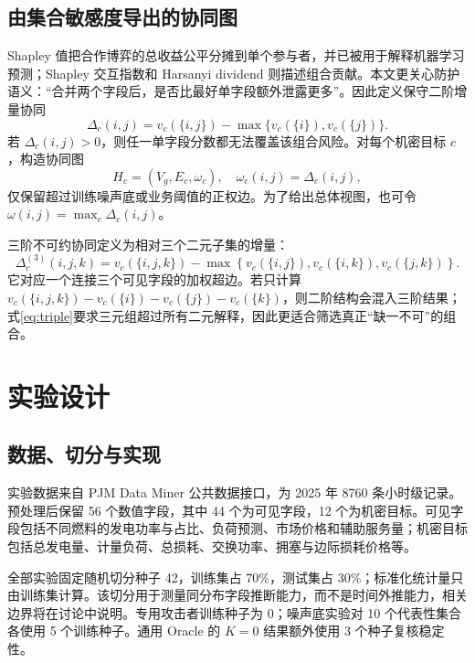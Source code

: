 \documentclass[UTF8,a4paper,zihao=5,fontset=fandol]{ctexart}
\begin{document}
\subsection{由集合敏感度导出的协同图}

Shapley 值把合作博弈的总收益公平分摊到单个参与者\citep{shapley1953value}，并已被用于解释机器学习预测\citep{lundberg2017shap}；Shapley 交互指数和 Harsanyi dividend 则描述组合贡献\citep{harsanyi1963bargaining,grabisch1999interaction}。本文更关心防护语义：“合并两个字段后，是否比最好单字段额外泄露更多”。因此定义保守二阶增量协同
\begin{equation}
  \Delta_c(i,j)=v_c(\{i,j\})
  -\max\{v_c(\{i\}),v_c(\{j\})\}.
  \label{eq:pair}
\end{equation}
若 $\Delta_c(i,j)>0$，则任一单字段分数都无法覆盖该组合风险。对每个机密目标 $c$，构造协同图
\begin{equation}
  H_c=(V_g,E_c,\omega_c),\quad
  \omega_c(i,j)=\Delta_c(i,j),
\end{equation}
仅保留超过训练噪声底或业务阈值的正权边。为了给出总体视图，也可令 $\omega(i,j)=\max_c\Delta_c(i,j)$。

三阶不可约协同定义为相对三个二元子集的增量：
\begin{equation}
  \Delta_c^{(3)}(i,j,k)
  =
  v_c(\{i,j,k\})-
  \max\left\{
  v_c(\{i,j\}),v_c(\{i,k\}),v_c(\{j,k\})
  \right\}.
  \label{eq:triple}
\end{equation}
它对应一个连接三个可见字段的加权超边\citep{berge1989hypergraphs}。若只计算 $v_c(\{i,j,k\})-v_c(\{i\})-v_c(\{j\})-v_c(\{k\})$，则二阶结构会混入三阶结果；式\eqref{eq:triple}要求三元组超过所有二元解释，因此更适合筛选真正“缺一不可”的组合。

\section{实验设计}

\subsection{数据、切分与实现}

实验数据来自 PJM Data Miner 公共数据接口\citep{pjmdataminer}，为 2025 年 8760 条小时级记录。预处理后保留 56 个数值字段，其中 44 个为可见字段，12 个为机密目标。可见字段包括不同燃料的发电功率与占比、负荷预测、市场价格和辅助服务量；机密目标包括总发电量、计量负荷、总损耗、交换功率、拥塞与边际损耗价格等。

全部实验固定随机切分种子 42，训练集占 70\%，测试集占 30\%；标准化统计量只由训练集计算。该切分用于测量同分布字段推断能力，而不是时间外推能力，相关边界将在讨论中说明。专用攻击者训练种子为 0；噪声底实验对 10 个代表性集合各使用 5 个训练种子。通用 Oracle 的 $K=0$ 结果额外使用 3 个种子复核稳定性。
\end{document}
